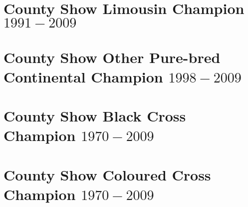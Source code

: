 \section[Limousin Champion]{County Show Limousin Champion $1991-2009$}
\small

\normalsize
\newpage
\section[Other Pure-bred Continental Champion]{County Show Other Pure-bred Continental Champion $1998-2009$}
\small

\normalsize
\newpage
\section[Black Cross Champion]{County Show Black Cross Champion $1970 - 2009$}
\small

\normalsize
\newpage
\section[Coloured Cross Champion]{County Show Coloured Cross Champion $1970 - 2009$}
\small

\normalsize
